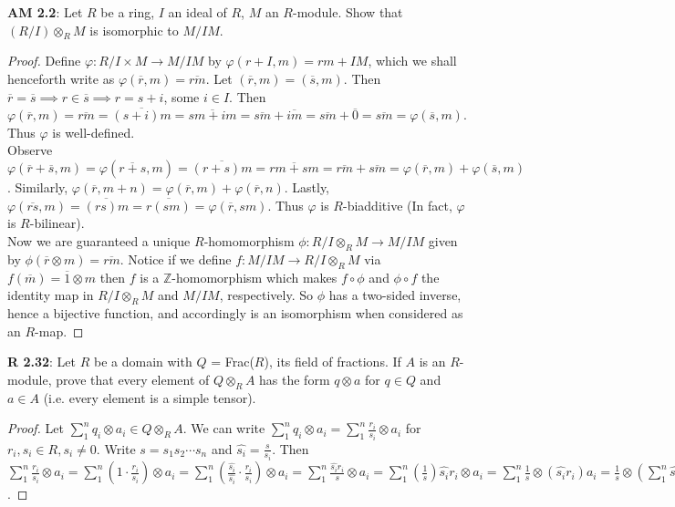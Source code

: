 \documentclass[8pt]{amsart}
\theoremstyle{plain}%
\theoremstyle{definition}
\theoremstyle{remark}
\numberwithin{equation}{section}
\newcommand{\Z}{\mathbb{Z}}
\begin{document}
\textbf{ AM 2.2}: Let $R$ be a ring, $I$ an ideal of $R$, $M$ an $R$-module. Show that $(R/I) \otimes_RM$ is isomorphic to $M/IM$. 
	\begin{proof}
		Define $\varphi : R/I \times M \to M/IM$ by $\varphi(r + I, m) = rm + IM$, which we shall henceforth write as $\varphi(\overline{r}, m) = \overline{rm}$. Let $(\overline{r}, m) = (\overline{s}, m)$. Then $\overline{r} = \overline{s} \implies r \in \overline{s} \implies r=s+i$, some $i \in I$. Then $\varphi(\overline{r},m)=\overline{rm}=\overline{(s+i)m}=\overline{sm+im}=\overline{sm}+\overline{im}=\overline{sm}+\overline{0}=\overline{sm}=\varphi(\overline{s},m)$. Thus $\varphi$ is well-defined.\\ 
		
		Observe $\varphi(\overline{r}+\overline{s},m)=\varphi(\overline{r+s},m)=\overline{(r+s)m}=\overline{rm+sm}=\overline{rm}+\overline{sm}=\varphi(\overline{r},m)+\varphi(\overline{s},m)$. Similarly, $\varphi(\overline{r},m+n)=\varphi(\overline{r},m)+\varphi(\overline{r},n)$. Lastly, $\varphi(\overline{rs},m)=\overline{(rs)m}=\overline{r(sm)}=\varphi(\overline{r},sm)$. Thus $\varphi$ is $R$-biadditive (In fact, $\varphi$ is $R$-bilinear).\\
		
		 Now we are guaranteed a unique $R$-homomorphism $\phi : R/I \otimes_RM \rightarrow M/IM$ given by $\phi(\overline{r} \otimes m)=\overline{rm}$. Notice if we define $f : M/IM \rightarrow R/I \otimes_RM$ via $f(\overline{m})=\overline{1}\otimes m$ then $f$ is a $\Z$-homomorphism which makes $f \circ \phi$ and $\phi \circ f$ the identity map in $R/I \otimes_RM$ and $M/IM$, respectively. So $\phi$ has a two-sided inverse, hence a bijective function, and accordingly is an isomorphism when considered as an $R$-map. 
		 \end{proof}
		 
\textbf{R 2.32}: Let $R$ be a domain with $Q$ = Frac($R$), its field of fractions. If $A$ is an $R$-module, prove that every element of $Q \otimes_RA$ has the form $q \otimes a$ for $q \in Q $ and $a \in A$ (i.e. every element is a simple tensor).
\begin{proof}
		Let $\sum_1^n q_i \otimes a_i \in Q \otimes_RA$. We can write $\sum_1^n q_i \otimes a_i = \sum_1^n \frac{r_i}{s_i} \otimes a_i$ for $r_i,s_i \in R, s_i \neq 0$. Write $s=s_1s_2\cdots s_n$ and $\widehat{s_i}=\frac{s}{s_i}$. Then $\sum_1^n \frac{r_i}{s_i} \otimes a_i = \sum_1^n (1 \cdot \frac{r_i}{s_i}) \otimes a_i = \sum_1^n (\frac{\widehat{s_i}}{\widehat{s_i}} \cdot \frac{r_i}{s_i}) \otimes a_i = \sum_1^n \frac{\widehat{s_i}r_i}{s} \otimes a_i = \sum_1^n (\frac{1}{s})\widehat{s_i}r_i \otimes a_i = \sum_1^n \frac{1}{s} \otimes (\widehat{s_i}r_i)a_i = \frac{1}{s} \otimes (\sum_1^n \widehat{s_i}r_ia_i)$.
\end{proof}
\end{document}
